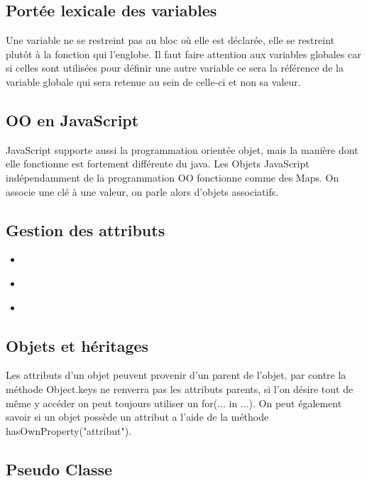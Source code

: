\documentclass{article}[12pt]
\newcommand{\JavaScript}[2]{
	\begin{itemize}
		\item[]
	\end{itemize}
}
\begin{document}
\subsection{Portée lexicale des variables}

Une variable ne se restreint pas au bloc où elle est déclarée, elle se restreint plutôt à la fonction qui  l'englobe.
\newline
\newline
Il faut faire attention aux variables globales car si celles sont utilisées pour définir une autre variable ce sera la référence de la variable globale qui sera retenue au sein de celle-ci et non sa valeur.

\subsection{OO en JavaScript}

JavaScript supporte aussi la programmation orientée objet, mais la manière dont elle fonctionne est fortement différente du java.
\newline
\newline
Les Objets JavaScript indépendamment de la programmation OO fonctionne comme des Maps. On associe une clé à une valeur, on parle alors d'objets associatifs.

\subsection{Gestion des attributs}

\JavaScript{attribute_value}{Valeur d'un attribut}
\JavaScript{change_value}{Modification d'un attribut}
\JavaScript{delete_value}{Suppresion d'un attribut}

\subsection{Objets et héritages}

Les attributs d'un objet peuvent provenir d'un parent de l'objet, par contre la méthode Object.keys ne renverra pas les attributs parents, si l'on désire tout de même y accéder on peut toujours utiliser un for(... in ...). On peut également savoir si un objet possède un attribut a l'aide de la méthode hasOwnProperty("attribut").

\subsection{Pseudo Classe}
\end{document}
